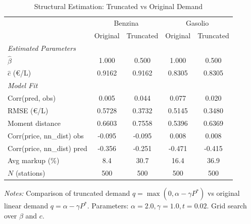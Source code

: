 \begin{table}[htbp]
  \centering
  \caption{Structural Estimation: Truncated vs Original Demand}
  \label{tab:estimation_truncated}
  \begin{threeparttable}
    \begin{tabular}{lcccc}
      \hline\hline
      & \multicolumn{2}{c}{Benzina} & \multicolumn{2}{c}{Gasolio} \\
      & Original & Truncated & Original & Truncated \\
      \hline
      \multicolumn{5}{l}{\textit{Estimated Parameters}} \\[2pt]
      $\hat{\beta}$ & 1.000 & 0.500 & 1.000 & 0.500 \\
      $\hat{c}$ (\euro/L) & 0.9162 & 0.9162 & 0.8305 & 0.8305 \\
      \hline
      \multicolumn{5}{l}{\textit{Model Fit}} \\[2pt]
      Corr(pred, obs) & 0.005 & 0.044 & 0.077 & 0.020 \\
      RMSE (\euro/L) & 0.5728 & 0.3732 & 0.5145 & 0.3480 \\
      Moment distance & 0.6603 & 0.7558 & 0.5396 & 0.6369 \\
      Corr(price, nn\_dist) obs & -0.095 & -0.095 & 0.008 & 0.008 \\
      Corr(price, nn\_dist) pred & -0.356 & -0.251 & -0.471 & -0.415 \\
      \hline
      Avg markup (\%) & 8.4 & 30.7 & 16.4 & 36.9 \\
      $N$ (stations) & 500 & 500 & 500 & 500 \\
      \hline\hline
    \end{tabular}
    \begin{tablenotes}
      \small
    \item \textit{Notes:} Comparison of truncated demand $q = \max(0, \alpha - \gamma P^*)$ vs original linear demand $q = \alpha - \gamma P^*$. Parameters: $\alpha=2.0, \gamma=1.0, t=0.02$. Grid search over $\beta$ and $c$.
    \end{tablenotes}
  \end{threeparttable}
\end{table}
